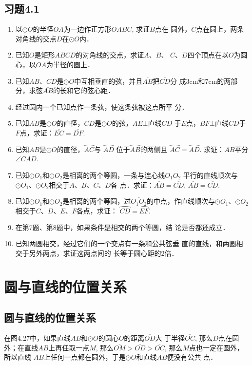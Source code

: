\subsection*{习题4.1}
\begin{enumerate}
\item 以$\odot O$的半径$\overline{OA}$为一边作正方形$OABC$, 求证$B$点在
圆外，$C$点在圆上，两条对角线的交点$D$在$\odot O$内．
\item 已知$O$是矩形$ABCD$的对角线的交点，求证$A$、$B$、
$C$、$D$四个顶点在以$O$为圆心，以$OA$为半径的圆上．
\item 已知$AB$、$CD$是$\odot O$中互相垂直的弦，并且$\overline{AB}$把$\overline{CD}$分
成3cm和7cm的两部分，求弦$\overline{AB}$的长和它的弦心距．
\item 经过圆内一个已知点作一条弦，使这条弦被这点所平
分．
\item 已知$\overline{AB}$是$\odot O$的直径，$\overline{CD}$是$\odot O$的弦，$AE\bot $直线$CD$
于$E$点，$BF\bot $直线$CD$于$F$点，求证：$\overline{EC}=\overline{DF}$.
\item 已知$\overline{AB}$是$\odot O$的直径，$\wideparen{AC}$与
$\wideparen{AD}$
位于$\wideparen{AB}$的两侧且
$\wideparen{AC}=\wideparen{AD}$. 求证：$AB$平分$\angle CAD$.
\item 已知$\odot O_1$和$\odot O_2$是相离的两个等圆，一条与连心线$O_1O_2$
平行的直线顺次与$\odot O_1$、$\odot O_2$相交于$A$、$B$、$C$、$D$各
点．求证：$\overline{AB}=\overline{CD}$, $\overline{AB}=\overline{CD}$.
\item 已知$\odot O_1$和$\odot O_2$是相离的两个等圆，过$\overline{O_1O_2}$的中点，作直线顺次与$\odot O_1$、$\odot O_2$相交于$C$、$D$、$E$、$F$各点，求证：
$\wideparen{CD}=\wideparen{EF}$.
\item 在第7题、第8题中，如果条件是相交的两个等圆，结
论是否都还成立．
\item 已知两圆相交，经过它们的一个交点有一条和公共弦垂
直的直线，和两圆相交于另外两点，求证这两点间的
长等于圆心距的2倍．
\end{enumerate}

\section{圆与直线的位置关系}
\subsection{圆与直线的位置关系}
在图4.27中，如果直线$AB$和$\odot O$的圆心$O$的距离$\overline{OD}$大
于半径$\overline{OC}$, 那么$D$点在圆外；在直线${AB}$上再任取一点$M$, 
那么$\overline{OM}>\overline{OD}>\overline{OC}$, 那么$M$点也一定在圆外，所以直线
$AB$上任何一点都在圆外，于是$\odot O$和直线$AB$便没有公共
点．


